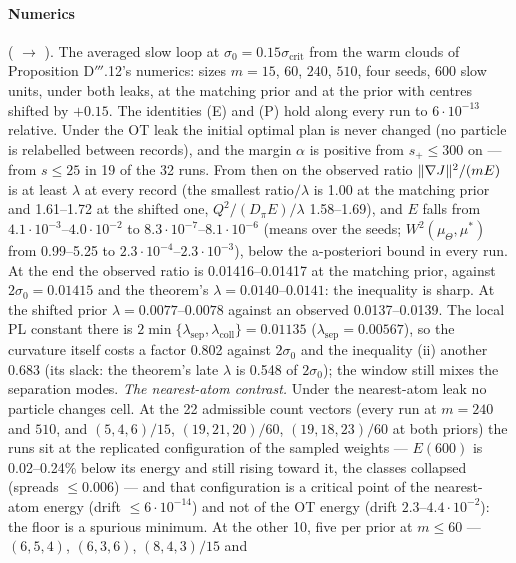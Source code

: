 \paragraph{Numerics} ( $\to$ ). The averaged slow loop at
$\sigma_0 = 0.15\sigma_{\mathrm{crit}}$ from the warm clouds of Proposition D$'''$.12's numerics: sizes $m = 15$,
$60$, $240$, $510$, four seeds, 600 slow units, under both leaks, at the matching prior and at the prior with
centres shifted by $+0.15$. The identities (E) and (P) hold along every run to $6\cdot10^{-13}$ relative. Under the
OT leak the initial optimal plan is never changed (no particle is relabelled between records), and the margin
$\alpha$ is positive from $s_+\le300$ on --- from $s\le25$ in 19 of the 32 runs. From then on the observed ratio
$\lVert \nabla J\rVert^2/(mE)$ is at least $\lambda$ at every record (the smallest ratio$/\lambda$ is 1.00 at the matching
prior and 1.61--1.72 at the shifted one, $Q^2/(D_\pi E)/\lambda$ 1.58--1.69), and $E$ falls from
$4.1\cdot10^{-3}$--$4.0\cdot10^{-2}$ to $8.3\cdot10^{-7}$--$8.1\cdot10^{-6}$ (means over the seeds;
$W^2(\mu_\Theta,\mu^*)$ from 0.99--5.25 to $2.3\cdot10^{-4}$--$2.3\cdot10^{-3}$), below the a-posteriori bound in
every run. At the end the observed ratio is 0.01416--0.01417 at the matching prior, against $2\sigma_0 = 0.01415$ and
the theorem's $\lambda = 0.0140$--$0.0141$: the inequality is sharp. At the shifted prior
$\lambda = 0.0077$--$0.0078$ against an observed 0.0137--0.0139. The local PL constant there is
$2\min\{\lambda_{\mathrm{sep}},\lambda_{\mathrm{coll}}\} = 0.01135$ ($\lambda_{\mathrm{sep}} = 0.00567$), so the
curvature itself costs a factor 0.802 against $2\sigma_0$ and the inequality (ii) another 0.683 (its slack: the
theorem's late $\lambda$ is 0.548 of $2\sigma_0$); the window still mixes the separation modes. \emph{The
nearest-atom contrast.} Under the nearest-atom leak no particle changes cell. At the 22 admissible count vectors
(every run at $m = 240$ and $510$, and $(5,4,6)/15$, $(19,21,20)/60$, $(19,18,23)/60$ at both priors) the runs sit at
the replicated configuration of the sampled weights --- $E(600)$ is 0.02--0.24\% below its energy and still rising
toward it, the classes collapsed (spreads $\le0.006$) --- and that configuration is a critical point of the
nearest-atom energy (drift $\le6\cdot10^{-14}$) and not of the OT energy (drift $2.3$--$4.4\cdot10^{-2}$): the floor
is a spurious minimum. At the other 10, five per prior at $m\le60$ --- $(6,5,4)$, $(6,3,6)$, $(8,4,3)/15$ and
